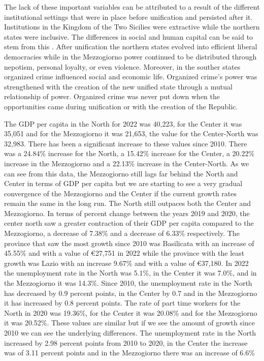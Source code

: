 \documentclass[12pt]{article}
\begin{document}
\begin{spacing}{1.5}
The lack of these important variables can be attributed to a result of the different institutional settings that were in place before unification and persisted after it. Institutions in the Kingdom of the Two Sicilies were extractive \cite{robinson2012nations} while the northern states were inclusive. The differences in social and human capital can be said to stem from this \cite{felice2013perche}. After unification the northern states evolved into efficient liberal democracies while in the Mezzogiorno power continued to be distributed through nepotism, personal loyalty, or even violence. Moreover, in the souther states organized crime influenced social and economic life. Organized crime's power was strengthened with the creation of the new unified state through a mutual relationship of power. Organized crime was never put down when the opportunities came during unification or with the creation of the Republic.

The GDP per capita in the North for 2022 was 40,223, for the Center it was 35,051 and for the Mezzogiorno it was 21,653, the value for the Center-North was 32,983. There has been a significant increase to these values since 2010. There was a 24.84\% increase for the North, a 15.42\% increase for the Center, a 20.22\% increase in the Mezzogiorno and a 22.13\% increase in the Center-North. As we can see from this data, the Mezzogiorno still lags far behind the North and Center in terms of GDP per capita but we are starting to see a very gradual convergence of the Mezzogiorno and the Center if the current growth rates remain the same in the long run. The North still outpaces both the Center and Mezzogiorno. In terms of percent change between the years 2019 and 2020, the center north saw a greater contraction of their GDP per capita compared to the Mezzogiorno, a decrease of 7.38\% and a decrease of 6.33\% respectively. The province that saw the most growth since 2010 was Basilicata with an increase of 45.55\% and with a value of €27,751 in 2022 while the province with the least growth was Lazio with an increase 9.67\% and with a value of €37,180. In 2022 the unemployment rate in the North was 5.1\%, in the Center it was 7.0\%, and in the Mezzogiorno it was 14.3\%. Since 2010, the unemployment rate in the North has decreased by 0.9 percent points, in the Center by 0.7 and in the Mezzogiorno it has increased by 0.8 percent points. The rate of part time workers for the North in 2020 was 19.36\%, for the Center it was 20.08\% and for the Mezzogiorno it was 20.52\%. These values are similar but if we see the amount of growth since 2010 we can see the underlying differences. The unemployment rate in the North increased by 2.98 percent points from 2010 to 2020, in the Center the increase was of 3.11 percent points and in the Mezzogiorno there was an increase of 6.6\%

\end{spacing}
\end{document}

